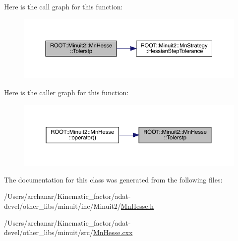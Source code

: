 Here is the call graph for this function\+:
\nopagebreak
\begin{figure}[H]
\begin{center}
\leavevmode
\includegraphics[width=350pt]{d1/d02/classROOT_1_1Minuit2_1_1MnHesse_a4b36474a0d157ecb634bbf5d120db669_cgraph}
\end{center}
\end{figure}
Here is the caller graph for this function\+:
\nopagebreak
\begin{figure}[H]
\begin{center}
\leavevmode
\includegraphics[width=350pt]{d1/d02/classROOT_1_1Minuit2_1_1MnHesse_a4b36474a0d157ecb634bbf5d120db669_icgraph}
\end{center}
\end{figure}


The documentation for this class was generated from the following files\+:\begin{DoxyCompactItemize}
\item 
/\+Users/archanar/\+Kinematic\+\_\+factor/adat-\/devel/other\+\_\+libs/minuit/inc/\+Minuit2/\mbox{\hyperlink{adat-devel_2other__libs_2minuit_2inc_2Minuit2_2MnHesse_8h}{Mn\+Hesse.\+h}}\item 
/\+Users/archanar/\+Kinematic\+\_\+factor/adat-\/devel/other\+\_\+libs/minuit/src/\mbox{\hyperlink{adat-devel_2other__libs_2minuit_2src_2MnHesse_8cxx}{Mn\+Hesse.\+cxx}}\end{DoxyCompactItemize}

